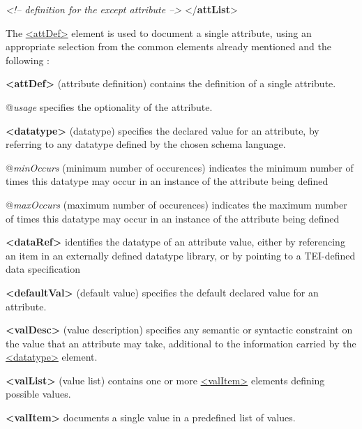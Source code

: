 \begin{shaded}
\textit{<!-- definition for the except attribute -->}\mbox{}\newline 
\hspace*{1em}\mbox{}\newline 
{}\mbox{}\newline 
{</\textbf{attList}>}\end{shaded}\egroup\par \par
The \hyperref[TEI.attDef]{<attDef>} element is used to document a single attribute, using an appropriate selection from the common elements already mentioned and the following : 
\begin{sansreflist}
  
\item [\textbf{<attDef>}] (attribute definition) contains the definition of a single attribute.\hfil\\[-10pt]\begin{sansreflist}
    \item[@{\itshape usage}]
  specifies the optionality of the attribute.
\end{sansreflist}  
\item [\textbf{<datatype>}] (datatype) specifies the declared value for an attribute, by referring to any datatype defined by the chosen schema language.\hfil\\[-10pt]\begin{sansreflist}
    \item[@{\itshape minOccurs}]
  (minimum number of occurences) indicates the minimum number of times this datatype may occur in an instance of the attribute being defined
    \item[@{\itshape maxOccurs}]
  (maximum number of occurences) indicates the maximum number of times this datatype may occur in an instance of the attribute being defined
\end{sansreflist}  
\item [\textbf{<dataRef>}] identifies the datatype of an attribute value, either by referencing an item in an externally defined datatype library, or by pointing to a TEI-defined data specification
\item [\textbf{<defaultVal>}] (default value) specifies the default declared value for an attribute.
\item [\textbf{<valDesc>}] (value description) specifies any semantic or syntactic constraint on the value that an attribute may take, additional to the information carried by the \hyperref[TEI.datatype]{<datatype>} element.
\item [\textbf{<valList>}] (value list) contains one or more \hyperref[TEI.valItem]{<valItem>} elements defining possible values.
\item [\textbf{<valItem>}] documents a single value in a predefined list of values.
\end{sansreflist}
